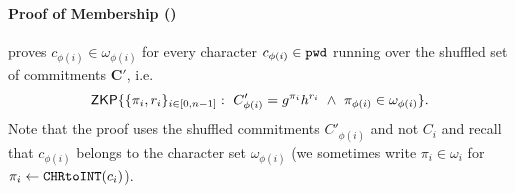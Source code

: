 \paragraph{Proof of Membership (\PoM)}
\PoM proves $c_{\phi(i)}\in\omega_{\phi(i)}$ for every character $c_{\phi(i)}\in\mathtt{pwd}$ running over the shuffled set of commitments $\bm C'$, i.e.
\begin{equation*}
\mathsf{ZKP}\{\{\pi_i,r_i\}_{i\in[0,n-1]} : ~ C'_{\phi(i)}=g^{\pi_{i}}h^{r_{i}} ~ \wedge ~ \pi_{\phi(i)}\in \omega_{\phi(i)}\}.
\end{equation*}
Note that the proof uses the shuffled commitments $C'_{\phi(i)}$ and not $C_i$ and recall that $c_{\phi(i)}$ belongs to the character set $\omega_{\phi(i)}$ (we sometimes write $\pi_i\in\omega_i$ for $\pi_i\gets\texttt{CHRtoINT}(c_i)$).
